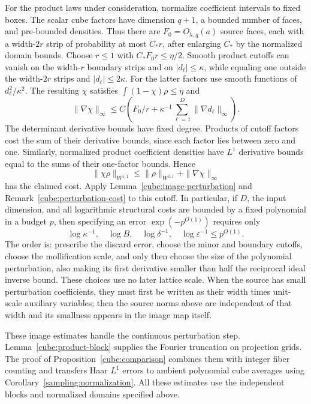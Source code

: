 For the product laws under consideration, normalize coefficient
intervals to fixed boxes.  The scalar cube factors have dimension
$q+1$, a bounded number of faces, and pre-bounded densities.  Thus
there are $F_0=O_{h,q}(a)$ source faces, each with a width-$2r$
strip of probability at most $C_*r$, after enlarging $C_*$ by the
normalized domain bounds.  Choose $r\le1$ with
$C_*F_0r\le\eta/2$.  Smooth product cutoffs can vanish on the
width-$r$ boundary strips and on $|d_\ell|\le\kappa$, while
equaling one outside the width-$2r$ strips and $|d_\ell|\le2\kappa$.
For the latter factors use smooth functions of $d_\ell^2/\kappa^2$.
The resulting $\chi$ satisfies $\int(1-\chi)\rho\le\eta$ and
\[
 \|\nabla\chi\|_\infty
 \le C\left(F_0/r+
       \kappa^{-1}\sum_{\ell=1}^D\|\nabla d_\ell\|_\infty\right).
\]
The determinant derivative bounds have fixed degree.  Products of
cutoff factors cost the sum of their derivative bounds, since each
factor lies between zero and one.  Similarly, normalized product
coefficient densities have $L^1$ derivative bounds equal to the sums
of their one-factor bounds.  Hence
\[
 \|\chi\rho\|_{W^{1,1}}
 \le \|\rho\|_{W^{1,1}}+\|\nabla\chi\|_\infty
\]
has the claimed cost.  Apply Lemma~\ref{cube:image-perturbation}
and Remark~\ref{cube:perturbation-cost} to this cutoff.  In particular,
if $D$, the input dimension, and all logarithmic structural costs are
bounded by a fixed polynomial in a budget $p$, then specifying an error
$\exp(-p^{O(1)})$ requires only
\[
 \log\kappa^{-1},\quad \log B,
 \quad\log\delta^{-1},\quad\log\varepsilon^{-1}
       \leq p^{O(1)}.
\]
The order is: prescribe the discard error, choose the minor and
boundary cutoffs, choose the mollification scale, and only then
choose the size of the polynomial perturbation, also making its
first derivative smaller than half the reciprocal ideal inverse
bound.  These choices use no later lattice scale.  When the source
has small perturbation coefficients, they must first be written as
their width times unit-scale auxiliary variables; then the source
norms above are independent of that width and its smallness appears
in the image map itself.

These image estimates handle the continuous perturbation step.
Lemma~\ref{cube:product-block} supplies the Fourier truncation on
projection grids. The proof of Proposition~\ref{cube:comparison}
combines them with integer fiber counting and transfers Haar $L^1$
errors to ambient polynomial cube averages using
Corollary~\ref{sampling:normalization}. All these estimates use the
independent blocks and normalized domains specified above.

